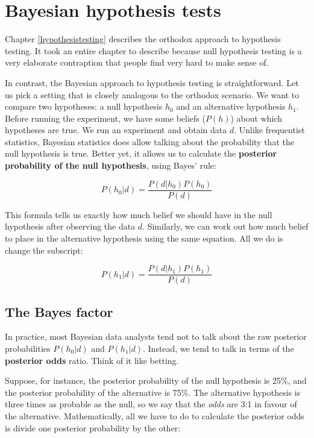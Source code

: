 \documentclass[
  11pt,
  a4paper,
  twoside,symmetric,openright]{book}
\theoremstyle{break}
\theoremstyle{break}
\begin{document}
\chapter{Bayesian hypothesis tests}\label{bayesianhypothesistests}

Chapter \ref{hypothesistesting} describes the orthodox approach to hypothesis testing. It took an entire chapter to describe because null hypothesis testing is a very elaborate contraption that people find very hard to make sense of.

In contrast, the Bayesian approach to hypothesis testing is straightforward. Let us pick a setting that is closely analogous to the orthodox scenario. We want to compare two hypotheses: a null hypothesis \(h_0\) and an alternative hypothesis \(h_1\). Before running the experiment, we have some beliefs (\(P(h)\)) about which hypotheses are true. We run an experiment and obtain data \(d\). Unlike frequentist statistics, Bayesian statistics does allow talking about the probability that the null hypothesis is true. Better yet, it allows us to calculate the \textbf{posterior probability of the null hypothesis}, using Bayes' rule:

\[
P(h_0 | d) = \frac{P(d|h_0) P(h_0)}{P(d)}
\]

This formula tells us exactly how much belief we should have in the null hypothesis after observing the data \(d\). Similarly, we can work out how much belief to place in the alternative hypothesis using the same equation. All we do is change the subscript:

\[
P(h_1 | d) = \frac{P(d|h_1) P(h_1)}{P(d)}
\]

\section{The Bayes factor}\label{the-bayes-factor}

In practice, most Bayesian data analysts tend not to talk about the raw posterior probabilities \(P(h_0|d)\) and \(P(h_1|d)\). Instead, we tend to talk in terms of the \textbf{posterior odds} ratio. Think of it like betting.

Suppose, for instance, the posterior probability of the null hypothesis is 25\%, and the posterior probability of the alternative is 75\%. The alternative hypothesis is three times as probable as the null, so we say that the \emph{odds} are 3:1 in favour of the alternative. Mathematically, all we have to do to calculate the posterior odds is divide one posterior probability by the other:
\end{document}
